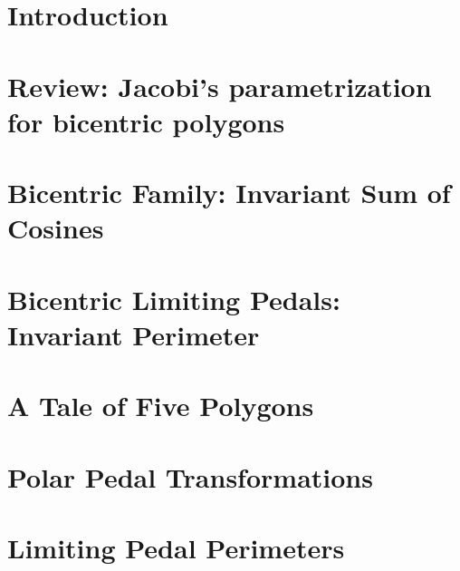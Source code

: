 
\section{ Introduction}
\label{sec:06-intro}



\section{Review: Jacobi's parametrization for bicentric polygons}
\label{sec:06-jacobi}


\section{Bicentric Family: Invariant Sum of Cosines}
\label{sec:06-bicentric-sum-of-cosines}
  

%  

\section{Bicentric Limiting Pedals: Invariant Perimeter}
\label{sec:06-pedal-perimeter}
  

\section{A Tale of Five Polygons}
\label{sec:06-five-polys}
  

%

 
\section{Polar Pedal Transformations}
\label{sec:06-polar-pedal}
 
\section{Limiting Pedal Perimeters}
\label{sec:06-explicit-perimeter}


